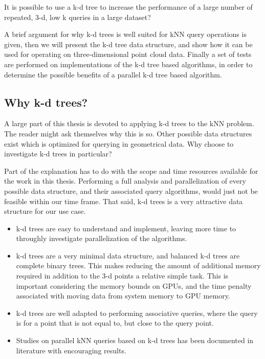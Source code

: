 \begin{myrq}
\label{rq:serial-kd-tree}
    It is possible to use a k-d tree to increase the performance of a large number of repeated, 3-d, low k queries in a large dataset?
\end{myrq}

A brief argument for why k-d trees is well suited for kNN query operations is given, then we will present the k-d tree data structure, and show how it can be used for operating on three-dimensional point cloud data. Finally a set of tests are performed on implementations of the k-d tree based algorithms, in order to determine the possible benefits of a parallel k-d tree based algorithm.

\subsection{Why k-d trees?} %
\label{sub:why_k_d_trees_}
A large part of this thesis is devoted to applying k-d trees to the kNN problem. The reader might ask themselves why this is so. Other possible data structures exist which is optimized for querying in geometrical data. Why choose to investigate k-d trees in particular?

Part of the explanation has to do with the scope and time resources available for the work in this thesis. Performing a full analysis and parallelization of every possible data structure, and their associated query algorithms, would just not be feasible within our time frame. That said, k-d trees is a very attractive data structure for our use case.

\begin{itemize}
    \item k-d trees are easy to understand and implement, leaving more time to throughly investigate parallelization of the algorithms.
    \item k-d trees are a very minimal data structure, and balanced k-d trees are complete binary trees. This makes reducing the amount of additional memory required in addition to the 3-d points a relative simple task. This is important considering the memory bounds on GPUs, and the time penalty associated with moving data from system memory to GPU memory.
    \item k-d trees are well adapted to performing associative queries, where the query is for a point that is not equal to, but close to the query point.
    \item Studies on parallel kNN queries based on k-d trees has been documented in literature with encouraging results\cite{Owens:2007:ASO,Zhou:2008:RKC:1409060.1409079, Brown2010}.
\end{itemize}

